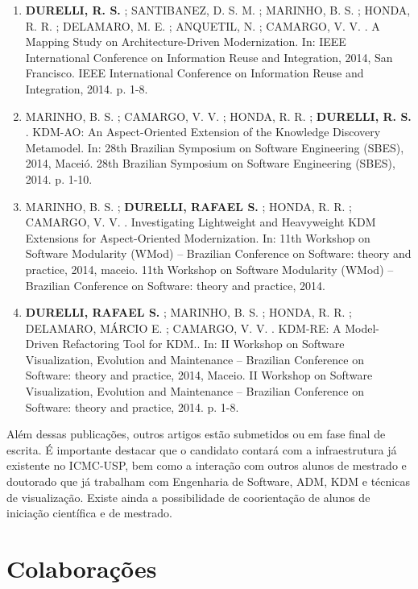 \documentclass[12pt]{article}
\begin{document}
\begin{itemize}
\begin{enumerate}
		\item \textbf{DURELLI, R. S.} ; SANTIBANEZ, D. S. M. ; MARINHO, B. S. ; HONDA, R. R. ; DELAMARO, M. E. ; ANQUETIL, N. ; CAMARGO, V. V. . A Mapping Study on Architecture-Driven Modernization. In: IEEE International Conference on Information Reuse and Integration, 2014, San Francisco. IEEE International Conference on Information Reuse and Integration, 2014. p. 1-8.
		
		\item MARINHO, B. S. ; CAMARGO, V. V. ; HONDA, R. R. ; \textbf{DURELLI, R. S.} . KDM-AO: An Aspect-Oriented Extension of the Knowledge Discovery Metamodel. In: 28th Brazilian Symposium on Software Engineering (SBES), 2014, Maceió. 28th Brazilian Symposium on Software Engineering (SBES), 2014. p. 1-10.
		
		\item MARINHO, B. S. ; \textbf{DURELLI, RAFAEL S.} ; HONDA, R. R. ; CAMARGO, V. V. . Investigating Lightweight and Heavyweight KDM Extensions for Aspect-Oriented Modernization. In: 11th Workshop on Software Modularity (WMod) -- Brazilian Conference on Software: theory and practice, 2014, maceio. 11th Workshop on Software Modularity (WMod) -- Brazilian Conference on Software: theory and practice, 2014.
		
		\item \textbf{DURELLI, RAFAEL S.} ; MARINHO, B. S. ; HONDA, R. R. ; DELAMARO, MÁRCIO E. ; CAMARGO, V. V. . KDM-RE: A Model-Driven Refactoring Tool for KDM.. In: II Workshop on Software Visualization, Evolution and Maintenance -- Brazilian Conference on Software: theory and practice, 2014, Maceio. II Workshop on Software Visualization, Evolution and Maintenance -- Brazilian Conference on Software: theory and practice, 2014. p. 1-8.

\end{enumerate}
\end{itemize}

Além dessas publicações, outros artigos estão submetidos ou em fase final de escrita. É importante destacar que o candidato contará com a infraestrutura já existente no ICMC-USP, bem como a interação com outros alunos de mestrado e doutorado que já trabalham com Engenharia de Software, ADM, KDM e técnicas de visualização. Existe ainda a possibilidade de coorientação de alunos de iniciação científica e de mestrado.

\section{Colaborações}\label{sec:colaboracoes}
\end{document}
